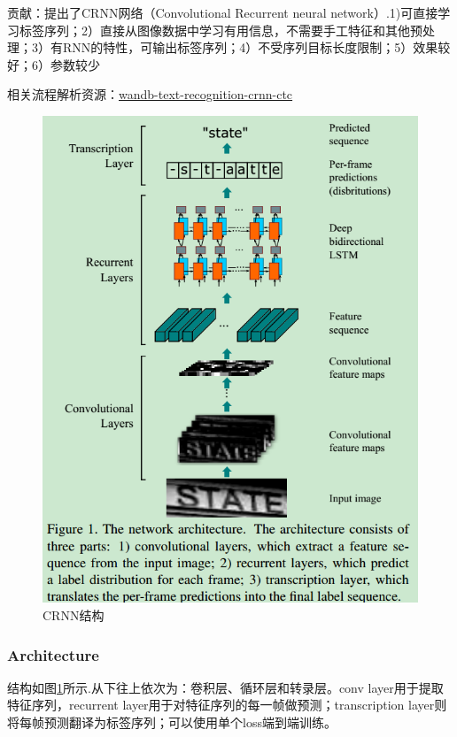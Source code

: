 \documentclass{article}
\begin{document}
贡献：提出了CRNN网络（Convolutional Recurrent neural network）.1)可直接学习标签序列；2）直接从图像数据中学习有用信息，不需要手工特征和其他预处理；3）有RNN的特性，可输出标签序列；4）不受序列目标长度限制；5）效果较好；6）参数较少

相关流程解析资源：\href {https://wandb.ai/authors/text-recognition-crnn-ctc/reports/Text-Recognition-With-CRNN-CTC-Network--VmlldzoxNTI5NDI}{wandb-text-recognition-crnn-ctc}

\begin{figure}
\centering
\includegraphics[scale=0.5]{images/CRNN/CRNN.png}
\caption{CRNN结构}
\label{Fig.crnn}
\end{figure}

\subsubsection{Architecture}
结构如图\ref{Fig.crnn}所示.从下往上依次为：卷积层、循环层和转录层。conv layer用于提取特征序列，recurrent layer用于对特征序列的每一帧做预测；transcription layer则将每帧预测翻译为标签序列；可以使用单个loss端到端训练。
\end{document}
